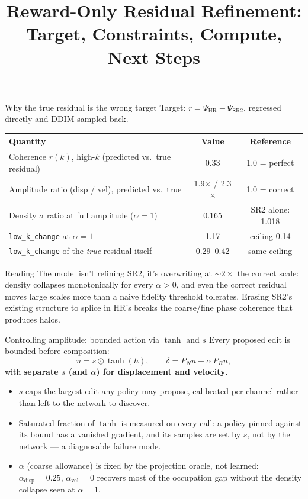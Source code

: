 \documentclass[aspectratio=169]{beamer}
\title{Reward-Only Residual Refinement: Target, Constraints, Compute, Next Steps}
\author{}
\date{}
\begin{document}
\begin{frame}{Why the true residual is the wrong target}
\small
Target: $r = \Psi_{\mathrm{HR}} - \Psi_{\mathrm{SR2}}$, regressed directly and DDIM-sampled back.

\vspace{0.2cm}
\centering
\begin{tabular}{l c c}
\hline
Quantity & Value & Reference \\
\hline
Coherence $r(k)$, high-$k$ (predicted vs.\ true residual) & 0.33 & 1.0 = perfect \\
Amplitude ratio (disp / vel), predicted vs.\ true & 1.9$\times$ / 2.3$\times$ & 1.0 = correct \\
Density $\sigma$ ratio at full amplitude ($\alpha=1$) & \alert{0.165} & SR2 alone: 1.018 \\
\texttt{low\_k\_change} at $\alpha=1$ & 1.17 & ceiling 0.14 \\
\texttt{low\_k\_change} of the \emph{true} residual itself & 0.29--0.42 & same ceiling \\
\hline
\end{tabular}

\vspace{0.3cm}
\begin{block}{Reading}
The model isn't refining SR2, it's overwriting at $\sim\!2\times$ the correct
scale: density collapses monotonically for every $\alpha>0$, and even the
correct residual moves large scales more than a naive fidelity threshold
tolerates. Erasing SR2's existing structure to splice in HR's breaks the
coarse/fine phase coherence that produces halos.
\end{block}
\end{frame}

\begin{frame}{Controlling amplitude: bounded action via $\tanh$ and $s$}
\small
Every proposed edit is bounded before composition:
\[
u = s \odot \tanh(h), \qquad
\delta = P_N u + \alpha\, P_R u,
\]
with \textbf{separate $s$ (and $\alpha$) for displacement and velocity}.

\vspace{0.3cm}
\begin{itemize}
    \item $s$ caps the largest edit any policy may propose, calibrated
          per-channel rather than left to the network to discover.
    \item Saturated fraction of $\tanh$ is measured on every call: a policy
          pinned against its bound has a vanished gradient, and its samples
          are set by $s$, not by the network — a diagnosable failure mode.
    \item $\alpha$ (coarse allowance) is fixed by the projection oracle, not
          learned: $\alpha_{\mathrm{disp}}=0.25$, $\alpha_{\mathrm{vel}}=0$
          recovers most of the occupation gap without the density collapse
          seen at $\alpha=1$.
\end{itemize}
\end{frame}
\end{document}
